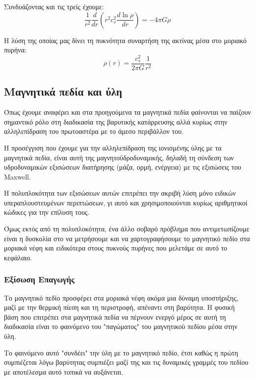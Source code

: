 \documentclass[a4paper,12pt]{memoir}
\begin{document}
Συνδυάζοντας και τις τρείς έχουμε:
\begin{equation}
\frac{1}{r^2}\frac{d}{dr} \left( r^2 c_s ^2 \frac{d \ln \rho}{dr}\right)  = -4 \pi G \rho
\end{equation}

Η λύση της οποίας μας δίνει τη πυκνότητα συναρτήση της ακτίνας μέσα στο μοριακό πυρήνα:
\begin{equation}
\label{eq:B-E_density}
\rho (r) =\frac{c_s ^2}{2 \pi G} \frac{1}{r^2}
\end{equation}

\subsection{Μαγνητικά πεδία και ύλη}
\label{par:frozenmagneticfield}
Όπως έχουμε αναφέρει και στα προηγούμενα τα μαγνητικά πεδία φαίνονται να παίζουν σημαντικό ρόλο στη διαδικασία της βαρυτικής κατάρρευσης αλλά κυρίως στην αλληλεπίδραση του πρωτοαστέρα με το άμεσο περιβάλλον του.

Η προσέγγιση που έχουμε για την αλληλεπίδραση της ιονισμένης ύλης με τα μαγνητικά πεδία, είναι αυτή της μαγνητοϋδροδυναμικής, δηλαδή τη σύνδεση των υδροδυναμικών εξισώσεων διατήρησης (μάζα, ορμή, ενέργεια) με τις εξισώσεις του Maxwell.  

Η πολυπλοκότητα των εξισώσεων αυτών επιτρέπει την ακριβή λύση μόνο ειδικών υπεραπλουστευμένων περιπτώσεων, γι αυτό και χρησιμοποιούνται κυρίως αριθμητικοί κώδικες για την επίλυση τους.

Όμως εκτός από τη πολυπλοκότητα, ένα άλλο σοβαρό πρόβλημα που αντιμετωπίζουμε είναι η δυσκολία στο να μετρήσουμε και να χαρτογραφήσουμε το μαγνητικό πεδίο στα μοριακά νέφη και ειδικότερα στους πυκνούς πυρήνες που μελετάμε σε αυτό το κεφάλαιο.  

\subsubsection{Εξίσωση Επαγωγής}
Το μαγνητικό πεδίο προσφέρει στα μοριακά νέφη ακόμα μια δύναμη υποστήριξης, μαζί με την θερμική πίεση και τη περιστροφή, απέναντι στη βαρύτητα. Η φυσική βάση που επιτρέπει στα μαγνητικά πεδία να πέρνουν ενεργό μέρος σε αυτή τη διαδικασία είναι το φαινόμενο του "παγώματος" του μαγνητικού πεδίου μέσα στην ύλη.

Το φαινόμενο αυτό "συνδέει" την ύλη με το μαγνητικό πεδίο, έτσι καθώς η πρώτη συμπιέζεται λόγω βαρύτητας συμπιέζει μαζί της και τις δυναμικές γραμμές του πεδίου με αποτέλεσμα αυτό τοπικά να αυξάνεται.
\end{document}
